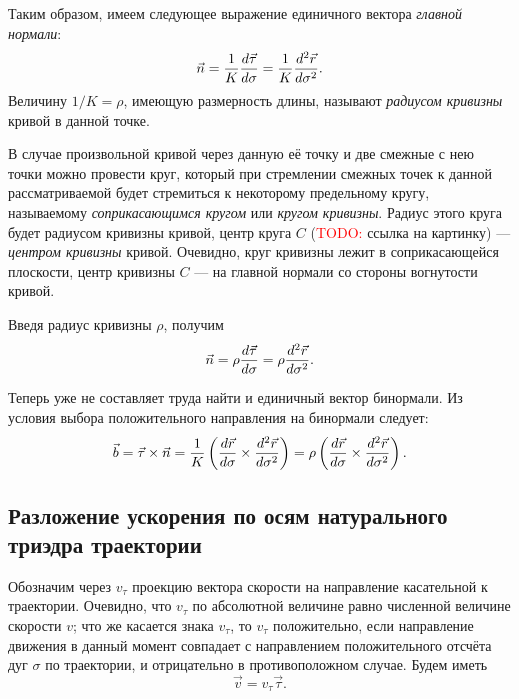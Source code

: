 Таким образом, имеем следующее выражение единичного вектора \textit{главной
нормали}:
\begin{equation}
  \label{eq:main_norm}
  \vec{n} = \frac{1}{K} \der[\vec{\tau}]{\sigma} = \frac{1}{K}
    \sder[\vec{r}]{\sigma}.
\end{equation}
Величину $1/K = \rho$, имеющую размерность длины, называют \textit{радиусом
кривизны} кривой в данной точке.

В случае произвольной кривой через данную её точку и две смежные с нею точки
можно провести круг, который при стремлении смежных точек к данной
рассматриваемой будет стремиться к некоторому предельному кругу, называемому 
\textit{соприкасающимся кругом} или \textit{кругом кривизны}. Радиус этого круга
будет радиусом кривизны кривой, центр круга $C$ (\textcolor{red}{TODO:} ссылка
на картинку) --- \textit{центром кривизны} кривой. Очевидно, круг кривизны лежит
в соприкасающейся плоскости, центр кривизны $C$ --- на главной нормали со
стороны вогнутости кривой.

Введя радиус кривизны $\rho$, получим
\begin{equation}
  \vec{n} = \rho \der[\vec{\tau}]{\sigma} = \rho \sder[\vec{r}]{\sigma}.
\end{equation}

Теперь уже не составляет труда найти и единичный вектор бинормали. Из условия
выбора положительного направления на бинормали следует:
\begin{equation}
  \vec{b} = \crossprod{\vec{\tau}}{\vec{n}} = \frac{1}{K}
  \paren{\crossprod{\der[\vec{r}]{\sigma}}{\sder[\vec{r}]{\sigma}}} = \rho
  \paren{\crossprod{\der[\vec{r}]{\sigma}}{\sder[\vec{r}]{\sigma}}}.
\end{equation}

\subsection{Разложение ускорения по осям натурального триэдра траектории}

Обозначим через $v_\tau$ проекцию вектора скорости на направление касательной
к траектории. Очевидно, что $v_\tau$ по абсолютной величине равно численной
величине скорости $v$; что же касается знака $v_\tau$, то $v_\tau$ положительно,
если направление движения в данный момент совпадает с направлением
положительного отсчёта дуг $\sigma$ по траектории, и отрицательно в
противоположном случае. Будем иметь
\begin{equation}
  \label{eq:vel_natural}
  \vec{v} = v_\tau \vec{\tau}.
\end{equation}


